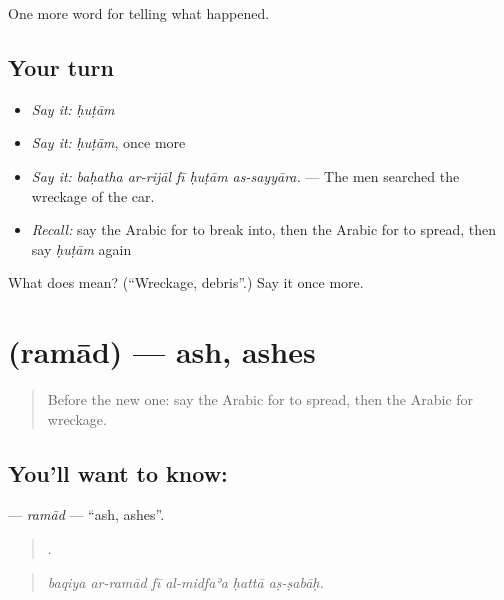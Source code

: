 \begin{grammarlens}[title={What you've built}]
One more word for telling what happened.
\end{grammarlens}

\subsection*{Your turn}
\begin{itemize}
\raggedright
  \item \emph{Say it:} \emph{ḥuṭām}
  \item \emph{Say it:} \emph{ḥuṭām}, once more
  \item \emph{Say it:} \emph{baḥatha ar-rijāl fī ḥuṭām as-sayyāra.} — The men searched the wreckage of the car.
  \item \emph{Recall:} say the Arabic for to break into, then the Arabic for to spread, then say \emph{ḥuṭām} again
\end{itemize}

\begin{tcolorbox}[breakable,colback=teal!4,colframe=teal!35!black,title={Before you move on}]
What does  mean? (\textquotedblleft{}Wreckage, debris\textquotedblright{}.) Say it once more.
\end{tcolorbox}
\section[\texorpdfstring{\ar{رماد} (ramād)}{رماد (ramād)}]{ (ramād) — ash, ashes}

\label{lesson:AR-C354-ramad}



\begin{quote}
Before the new one: say the Arabic for to spread, then the Arabic for wreckage.
\end{quote}

\subsection*{You'll want to know: }
\textbf{} — \emph{ramād} — \textquotedblleft{}ash, ashes\textquotedblright{}.

\begin{quote}
     .
\end{quote}

\begin{quote}
\emph{baqiya ar-ramād fī al-midfaʾa ḥattā aṣ-ṣabāḥ.}
\end{quote}

